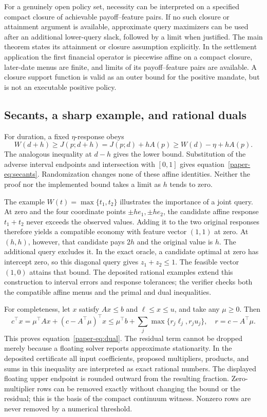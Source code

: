 For a genuinely open policy set, necessity can be interpreted on a specified compact closure of achievable payoff--feature pairs. If no such closure or attainment argument is available, approximate query maximizers can be used after an additional lower-query slack, followed by a limit when justified. The main theorem states its attainment or closure assumption explicitly. In the settlement application the first financial operator is piecewise affine on a compact closure, later-date menus are finite, and limits of its payoff--feature pairs are available. A closure support function is valid as an outer bound for the positive mandate, but is not an executable positive policy.

\subsection{Secants, a sharp example, and rational duals}
For duration, a fixed $\eta$-response obeys
\[
 W(d+h)\geq J(p;d+h)=J(p;d)+hA(p)\geq W(d)-\eta+hA(p).
\]
The analogous inequality at $d-h$ gives the lower bound. Substitution of the adverse interval endpoints and intersection with $[0,1]$ gives equation~\eqref{paper-eq:secants}. Randomization changes none of these affine identities. Neither the proof nor the implemented bound takes a limit as $h$ tends to zero.

The example $W(t)=\max\{t_1,t_2\}$ illustrates the importance of a joint query. At zero and the four coordinate points $\pm he_1,\pm he_2$, the candidate affine response $t_1+t_2$ never exceeds the observed values. Adding it to the two original responses therefore yields a compatible economy with feature vector $(1,1)$ at zero. At $(h,h)$, however, that candidate pays $2h$ and the original value is $h$. The additional query excludes it. In the exact oracle, a candidate optimal at zero has intercept zero, so this diagonal query gives $z_1+z_2\leq1$. The feasible vector $(1,0)$ attains that bound. The deposited rational examples extend this construction to interval errors and response tolerances; the verifier checks both the compatible affine menus and the primal and dual inequalities.

For completeness, let $x$ satisfy $Ax\leq b$ and $\ell\leq x\leq u$, and take any $\mu\geq0$. Then
\[
 c^\top x=\mu^\top Ax+(c-A^\top\mu)^\top x
 \leq\mu^\top b+\sum_j\max\{r_j\ell_j,r_ju_j\},\quad r=c-A^\top\mu.
\]
This proves equation~\eqref{paper-eq:dual}. The residual term cannot be dropped merely because a floating solver reports approximate stationarity. In the deposited certificate all input coefficients, proposed multipliers, products, and sums in this inequality are interpreted as exact rational numbers. The displayed floating upper endpoint is rounded outward from the resulting fraction. Zero-multiplier rows can be removed exactly without changing the bound or the residual; this is the basis of the compact continuum witness. Nonzero rows are never removed by a numerical threshold.

